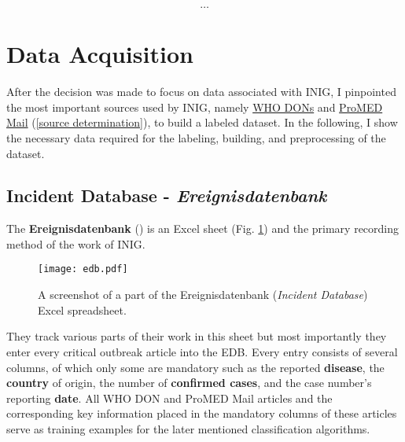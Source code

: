 

\[\dots\]

\section{Data Acquisition}
  After the decision was made to focus on data associated with INIG, I pinpointed the most important sources used by INIG, namely \href{https://www.who.int/csr/don/en/}{WHO DONs} and \href{https://www.promedmail.org}{ProMED Mail} (\ref{source determination}), to build a labeled dataset.
  In the following, I show the necessary data required for the labeling, building, and preprocessing of the dataset.

\subsection{Incident Database - \textit{Ereignisdatenbank}}
  The \textbf{Ereignisdatenbank} () is an Excel sheet (Fig. \ref{fig:edb_pic}) and the primary recording method of the work of INIG.
  \begin{figure}[h!]
    \centering
    \texttt{[image: edb.pdf]}
    \caption{A screenshot of a part of the Ereignisdatenbank (\textit{Incident Database}) Excel spreadsheet.}
  \label{fig:edb_pic}
  \end{figure}
  They track various parts of their work in this sheet but most importantly they enter every critical outbreak article into the EDB.
  Every entry consists of several columns, of which only some are mandatory such as the reported \textbf{disease}, the \textbf{country} of origin, the number of \textbf{confirmed cases}, and the case number's reporting \textbf{date}.
  All WHO DON and ProMED Mail articles and the corresponding key information placed in the mandatory columns of these articles serve as training examples for the later mentioned classification algorithms.


